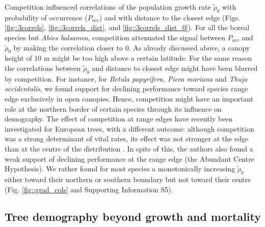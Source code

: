 Competition influenced correlations of the population growth rate $ \tilde \rho_0 $ with probability of occurrence ($ P_{occ} $) and with distance to the closest edge (Figs. \ref{fig::3correls}, \ref{fig::3correls_dist}, and \ref{fig::3correls_dist_0}). For all the boreal species but \textit{Abies balsamea}, competition attenuated the signal between $ P_{occ} $ and $ \tilde \rho_0 $ by making the correlation closer to 0. As already discussed above, a canopy height of $ 10 $ m might be too high above a certain latitude. For the same reason the correlations between $ \tilde \rho_0 $ and distance to closest edge might have been blurred by competition. For instance, for \textit{Betula papyrifera, Picea mariana} and \textit{Thuja occidentalis}, we found support for declining performance toward species range edge exclusively in open canopies. Hence, competition might have an important role at the northern border of certain species through its influence on demography. The effect of competition at range edges have recently been investigated for European trees, with a different outcome: although competition was a strong determinant of vital rates, its effect was not stronger at the edge than at the centre of the distribution \citep{Kunstler2019}. In spite of this, the authors also found a weak support of declining performance at the range edge (the Abundant Centre Hypothesis). We rather found for most species a monotonically increasing $ \tilde \rho_0 $ either toward their northern or southern boundary but not toward their centre (Fig. \ref{fig::grad_cols} and Supporting Information S5).

\subsection{Tree demography beyond growth and mortality}
